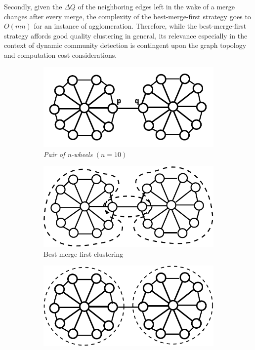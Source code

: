 \documentclass[conference]{IEEEtran}
\begin{document}
Secondly, given the $\Delta Q$ of the neighboring edges left in the wake of a 
merge changes after every merge, the complexity of the best-merge-first strategy 
goes to $O(mn)$ for an instance of agglomeration. Therefore, while the 
best-merge-first strategy affords good quality clustering in general, its 
relevance especially in the context of dynamic community detection is contingent 
upon the graph topology and computation cost considerations.
\begin{figure}
\begin{center}
\begin{subfigure}{0.45\textwidth}
\includegraphics[width=\linewidth]{wheel10.pdf}
\caption{\emph{Pair of n-wheels} $(n=10)$} \label{wheel10g}
\end{subfigure}
\end{center}
\begin{subfigure}{0.45\textwidth}
\includegraphics[width=\linewidth]{wheel10_bestfirst.pdf}
\caption{Best merge first clustering} \label{wheel10bf}
\end{subfigure}
\begin{subfigure}{0.45\textwidth}
\includegraphics[width=\linewidth]{wheel10_optclust.pdf}

\end{subfigure}
\end{figure}
\end{document}
